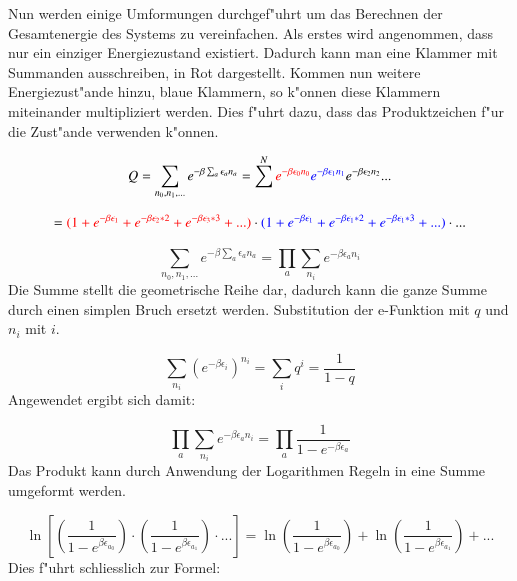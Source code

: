 \begin{refsection}
Nun werden einige Umformungen durchgef"uhrt um das Berechnen der Gesamtenergie des Systems zu vereinfachen.
Als erstes wird angenommen, dass nur ein einziger Energiezustand existiert.
Dadurch kann man eine Klammer mit Summanden ausschreiben, in Rot dargestellt.
Kommen nun weitere Energiezust"ande hinzu, blaue Klammern, so k"onnen diese Klammern miteinander multipliziert werden.
Dies f"uhrt dazu, dass das Produktzeichen f"ur die Zust"ande verwenden k"onnen.


\begin{equation}
Q = \sum\limits_{n_0, n_1,...} e^{- \beta \sum_a \epsilon_a n_a } 
=  \sum^N  \textcolor{red}{ e^{- \beta \epsilon_0 n_0 }} \textcolor{blue} {e^{- \beta \epsilon_1 n_1 }} e^{- \beta \epsilon_2 n_2 } ... 
\end{equation}

\begin{equation*}
= \textcolor{red} {(1+e^{- \beta \epsilon_1 }+e^{- \beta \epsilon_2*2  }+e^{- \beta \epsilon_3*3  }+...)} \cdot \textcolor{blue} {(1+e^{- \beta \epsilon_1 }+e^{- \beta \epsilon_1*2  }+e^{- \beta \epsilon_1*3  }+...)} \cdot ...
\end{equation*}

\begin{equation}
\sum\limits_{n_0, n_1,...} e^{- \beta \sum_a \epsilon_a n_a } = \prod_{a} \sum_{n_i} e^{- \beta \epsilon_a n_i }
\end{equation}
Die Summe stellt die geometrische Reihe dar, dadurch kann die ganze Summe durch einen simplen Bruch ersetzt werden. Substitution der e-Funktion mit $q$ und $n_i$ mit $i$.

\begin{equation}
\sum_{n_i} (e^{- \beta \epsilon_i })^{n_i} = \sum_{i} q^i = \frac {1}{1-q}
\end{equation}
Angewendet ergibt sich damit:

\begin{equation}
    \prod_{a} \sum_{n_i} e^{- \beta \epsilon_a n_i } = \prod_{a} \frac {1}{1-e^{- \beta \epsilon_a}}
\end{equation}
Das Produkt kann durch Anwendung der Logarithmen Regeln in eine Summe umgeformt werden.

\begin{equation}
\ln \left[ \left( \frac{1}{1-e^{\beta \epsilon_{a_0}}} \right) \cdot \left( \frac{1}{1-e^{ \beta \epsilon_{a_1}}} \right) \cdot ...\right] = \ln \left( \frac{1}{1-e^{\beta \epsilon_{a_0}}} \right) + \ln \left( \frac{1}{1-e^{\beta \epsilon_{a_1}}} \right) + ...
\end{equation}
Dies f"uhrt schliesslich zur Formel:


\end{refsection}
